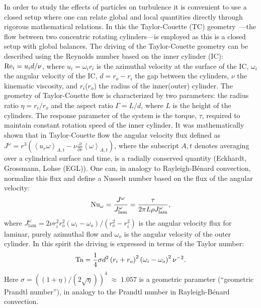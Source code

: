In order to study the effects of particles on turbulence it is convenient to
use a closed setup where one can relate global and local quantities directly
through rigorous mathematical relations. In this \docname the Taylor-Couette
(TC) geometry~\citep{Grossmann2016}---the flow between two concentric rotating
cylinders---is employed as this is a closed setup with global balances. The
driving of the Taylor-Couette geometry can be described using the Reynolds
number based on the inner cylinder (IC): $\text{Re}_i = u_i d / \nu$, where $u_i =
\omega_i r_i$ is the azimuthal velocity at the surface of the IC, $\omega_i$
the angular velocity of the IC, $d = r_o - r_i$ the gap between the cylinders,
$\nu$ the kinematic viscosity, and $r_i$($r_o$) the radius of the inner(outer)
cylinder. The geometry of Taylor-Couette flow is characterized by two
parameters: the radius ratio $\eta=r_i/r_o$ and the aspect ratio $\Gamma =
L/d$, where $L$ is the height of the cylinders. The response parameter of the
system is the torque, $\tau$, required to maintain constant rotation speed of
the inner cylinder. It was mathematically shown that in Taylor-Couette flow
the angular velocity flux defined as $J^\omega = r^3 \left(  \left
\langle u_r \omega \right \rangle_{A,t} - \nu \frac{\partial} {\partial r}
\left \langle \omega \right \rangle_{A,t} \right)$, where the subscript $A,t$
denotes averaging over a cylindrical surface and time,	is a radially
conserved quantity (Eckhardt, Grossmann, Lohse \citep{Eckhardt2007} (EGL)). One can, in analogy to
Rayleigh-B\'enard convection, normalize this flux and define a Nusselt number
based on the flux of the angular velocity:
\begin{equation}
  \text{Nu}_\omega = \frac{J^\omega}{J^\omega_{\text{lam}}} = \frac{\tau}{2 \pi L \rho J^\omega_{\text{lam}}},
\end{equation}
where $J^\omega_{\text{lam}} = 2 \nu r^2_i r^2_o \left( \omega_i - \omega_o
\right)/\left( r^2_o - r^2_i \right)$ is the angular velocity flux for
laminar, purely azimuthal flow and $\omega_o$ is the angular velocity of the
outer cylinder. In this spirit the driving is expressed in terms of the Taylor
number:
\begin{equation}
  \text{Ta} = \frac{1}{4} \sigma d^2 \left(r_i + r_o \right)^2 \left( \omega_i - \omega_o \right)^2 \nu^{-2}.
\end{equation}
Here $\sigma = \left( \left( 1 + \eta \right) / \left(2 \sqrt{\eta} \right)
\right)^4\;\approx\;1.057$ is a geometric parameter (``geometric Prandtl
number''), in analogy to the Prandtl number in Rayleigh-B\'enard convection.
